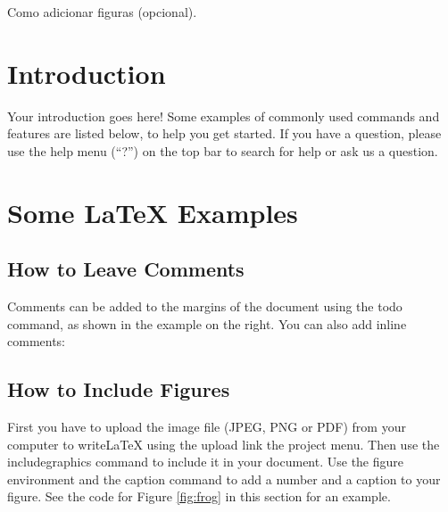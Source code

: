 \maketitle
\setcounter{page}{1}
\vspace*{3mm}

Como adicionar figuras (opcional).
\begin{center}
{}
\end{center}


\section{Introduction}

Your introduction goes here! Some examples of commonly used commands and features are listed below, to help you get started. If you have a question, please use the help menu (``?'') on the top bar to search for help or ask us a question.

\section{Some \LaTeX{} Examples}
\label{sec:examples}

\subsection{How to Leave Comments}

Comments can be added to the margins of the document using the  todo command, as shown in the example on the right. You can also add inline comments:


\subsection{How to Include Figures}

First you have to upload the image file (JPEG, PNG or PDF) from your computer to writeLaTeX using the upload link the project menu. Then use the includegraphics command to include it in your document. Use the figure environment and the caption command to add a number and a caption to your figure. See the code for Figure \ref{fig:frog} in this section for an example.

